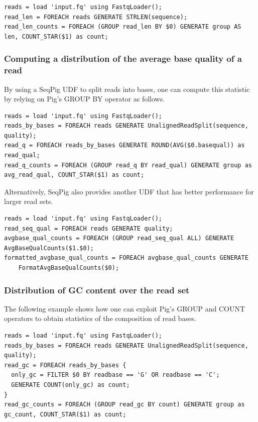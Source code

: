 {\begin{lstlisting}
reads = load 'input.fq' using FastqLoader();
read_len = FOREACH reads GENERATE STRLEN(sequence);
read_len_counts = FOREACH (GROUP read_len BY $0) GENERATE group AS len, COUNT_STAR($1) as count;
\end{lstlisting}

\subsubsection{Computing a distribution of the average base quality of a read}

By using a SeqPig UDF to split reads into bases, one can compute this
statistic by relying on Pig's GROUP BY operator as follows.
%
\begin{lstlisting}
reads = load 'input.fq' using FastqLoader();
reads_by_bases = FOREACH reads GENERATE UnalignedReadSplit(sequence, quality);
read_q = FOREACH reads_by_bases GENERATE ROUND(AVG($0.basequal)) as read_qual;
read_q_counts = FOREACH (GROUP read_q BY read_qual) GENERATE group as avg_read_qual, COUNT_STAR($1) as count;
\end{lstlisting}

Alternatively, SeqPig also provides another UDF that has better performance
for larger read sets.
%
\begin{lstlisting}
reads = load 'input.fq' using FastqLoader();
read_seq_qual = FOREACH reads GENERATE quality;
avgbase_qual_counts = FOREACH (GROUP read_seq_qual ALL) GENERATE AvgBaseQualCounts($1.$0);
formatted_avgbase_qual_counts = FOREACH avgbase_qual_counts GENERATE
    FormatAvgBaseQualCounts($0);
\end{lstlisting}

\subsubsection{Distribution of GC content over the read set}

The following example shows how one can exploit Pig's GROUP and COUNT
operators to obtain statistics of the composition of read bases.

\begin{lstlisting}
reads = load 'input.fq' using FastqLoader();
reads_by_bases = FOREACH reads GENERATE UnalignedReadSplit(sequence, quality);
read_gc = FOREACH reads_by_bases {
  only_gc = FILTER $0 BY readbase == 'G' OR readbase == 'C';
  GENERATE COUNT(only_gc) as count;
}
read_gc_counts = FOREACH (GROUP read_gc BY count) GENERATE group as gc_count, COUNT_STAR($1) as count;
\end{lstlisting}

}
